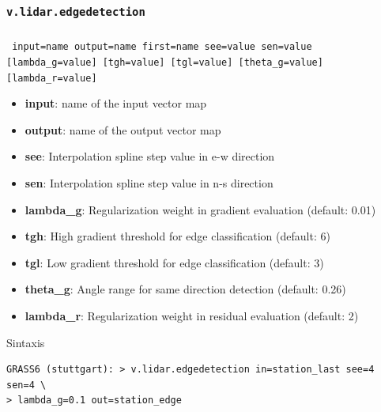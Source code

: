 \subsubsection{\texttt{v.lidar.edgedetection}}
\begin{frame}[fragile,shrink=10]
  \frametitle{}
  \begin{beamerboxesrounded}[shadow=true]{\textbf{}
    \texttt{ input=name output=name first=name see=value sen=value 
    [lambda\_g=value] [tgh=value] [tgl=value] [theta\_g=value] [lambda\_r=value]}}
   \begin{itemize}
    \item \textbf{input}: name of the input vector map
    \item \textbf{output}: name of the output vector map
    \item \textbf{see}: Interpolation spline step value in e-w direction
    \item \textbf{sen}: Interpolation spline step value in n-s direction
    \item \textbf{lambda\_g}: Regularization weight in gradient evaluation (default: 0.01)
    \item \textbf{tgh}: High gradient threshold for edge classification (default: 6)
    \item \textbf{tgl}: Low gradient threshold for edge classification (default: 3)
    \item \textbf{theta\_g}: Angle range for same direction detection (default: 0.26)
    \item \textbf{lambda\_r}: Regularization weight in residual evaluation (default: 2)
   \end{itemize}
  \end{beamerboxesrounded}
 \begin{beamerboxesrounded}[shadow=true]{Sintaxis}
\scriptsize
\begin{verbatim}
GRASS6 (stuttgart): > v.lidar.edgedetection in=station_last see=4 sen=4 \
> lambda_g=0.1 out=station_edge
\end{verbatim}
\end{beamerboxesrounded}
\end{frame}
